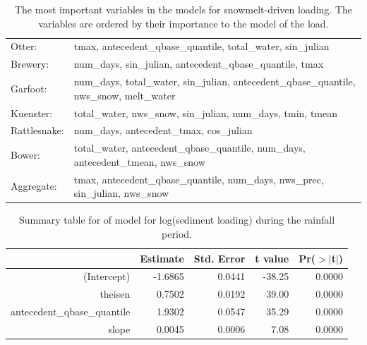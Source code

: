 \documentclass[10pt]{article}
\begin{document}
\begin{table}[h!]
\begin{center}
\begin{tabular}{ll}
        \hspace{5mm} Otter: & tmax, antecedent\_qbase\_quantile, total\_water, sin\_julian\\
        \hspace{5mm} Brewery: & num\_days, sin\_julian, antecedent\_qbase\_quantile, tmax\\
        \hspace{5mm} Garfoot: & num\_days, total\_water, sin\_julian, antecedent\_qbase\_quantile, nws\_snow, melt\_water\\
        \hspace{5mm} Kuenster: & total\_water, nws\_snow, sin\_julian, num\_days, tmin, tmean\\
        \hspace{5mm} Rattlesnake: & num\_days, antecedent\_tmax, cos\_julian\\
        \hspace{5mm} Bower: & total\_water, antecedent\_qbase\_quantile, num\_days, antecedent\_tmean, nws\_snow\\
        \hspace{5mm} Aggregate: & tmax, antecedent\_qbase\_quantile, num\_days, nws\_prec, sin\_julian, nws\_snow\\
    \end{tabular}
    \caption{The most important variables in the models for snowmelt-driven loading. The variables are ordered by their importance to the model of the load. \label{snow_predictor_list}}
    \end{center}
\end{table}


\begin{table}[ht]
\begin{center}
\begin{tabular}{rrrrr}
  \hline
 & Estimate & Std. Error & t value & Pr($>$$|$t$|$) \\ 
  \hline
(Intercept) & -1.6865 & 0.0441 & -38.25 & 0.0000 \\ 
  theisen & 0.7502 & 0.0192 & 39.00 & 0.0000 \\ 
  antecedent\_qbase\_quantile & 1.9302 & 0.0547 & 35.29 & 0.0000 \\ 
  slope & 0.0045 & 0.0006 & 7.08 & 0.0000 \\ 
   \hline
\end{tabular}
\caption{Summary table for of model for log(sediment loading) during the rainfall period.}
\end{center}
\end{table}
\end{document}
